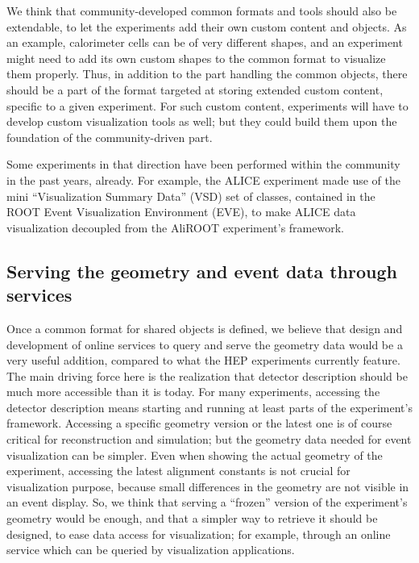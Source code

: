 \documentclass[12pt,a4paper]{article}
\begin{document}
We think that community-developed common formats and tools should also be extendable, to let the experiments add their own
custom content and objects. As an example, calorimeter cells can be of very different shapes, and an experiment might need to
add its own custom shapes to the common format to visualize them properly. Thus, in addition to the part handling the common objects,
there should be a part of the format targeted at storing extended custom content, specific to a given experiment. For such
custom content, experiments will have to develop custom visualization tools as well; but they could build them upon the foundation
of the community-driven part.

Some experiments in that direction have been performed within the community in the past years, already. For example,
the ALICE experiment made use of the mini ``Visualization Summary Data'' (VSD) set of classes, contained in the ROOT Event
Visualization Environment (EVE), to make ALICE data visualization decoupled from the AliROOT experiment’s framework.

\hypertarget{serving-data}{%
\subsection{Serving the geometry and event data through services}\label{serving-data}}

Once a common format for shared objects is defined, we believe that design and development of online services to query and
serve the geometry data would be a very useful addition, compared to what the HEP experiments currently feature.
The main driving force here is the realization that detector description should be much more accessible than it is today. For many experiments,
accessing the detector description means starting and running at least parts of the experiment’s framework. Accessing a specific
geometry version or the latest one is of course critical for reconstruction and simulation; but the geometry data needed for
event visualization can be simpler. Even when showing the actual geometry of the experiment, accessing the latest alignment
constants is not crucial for visualization purpose, because small differences in the geometry are not visible in an event display.
So, we think that serving a “frozen” version of the experiment’s geometry would be enough, and that a simpler way to retrieve
it should be designed, to ease data access for visualization; for example, through an online service which can be queried by
visualization applications.
\end{document}

